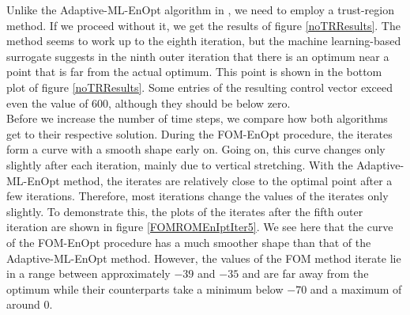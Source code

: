 Unlike the Adaptive-ML-EnOpt algorithm in \cite{Keil2022-dj}, we need to employ a trust-region method. If we proceed without it, we get the results of figure \ref{noTRResults}. The method seems to work up to the eighth iteration, but the machine learning-based surrogate suggests in the ninth outer iteration that there is an optimum near a point that is far from the actual optimum. This point is shown in the bottom plot of figure \ref{noTRResults}. Some entries of the resulting control vector exceed even the value of $600$, although they should be below zero.\\

Before we increase the number of time steps, we compare how both algorithms get to their respective solution. During the FOM-EnOpt procedure, the iterates form a curve with a smooth shape early on. Going on, this curve changes only slightly after each iteration, mainly due to vertical stretching. With the Adaptive-ML-EnOpt method, the iterates are relatively close to the optimal point after a few iterations. Therefore, most iterations change the values of the iterates only slightly. To demonstrate this, the plots of the iterates after the fifth outer iteration are shown in figure \ref{FOMROMEnIptIter5}. We see here that the curve of the FOM-EnOpt procedure has a much smoother shape than that of the Adaptive-ML-EnOpt method. However, the values of the FOM method iterate lie in a range between approximately $-39$ and $-35$ and are far away from the optimum while their counterparts take a minimum below $-70$ and a maximum of around $0$.

